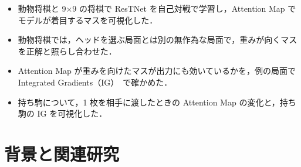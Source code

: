 \documentclass[submit]{ipsj}
\begin{document}
\begin{itemize}
  \item 動物将棋と 9×9 の将棋で ResTNet を自己対戦で学習し，Attention Map でモデルが着目するマスを可視化した．
  \item 動物将棋では，ヘッドを選ぶ局面とは別の無作為な局面で，重みが向くマスを正解と照らし合わせた．
  \item Attention Map が重みを向けたマスが出力にも効いているかを，例の局面で Integrated Gradients（IG）~\cite{ig}で確かめた．
  \item 持ち駒について，1 枚を相手に渡したときの Attention Map の変化と，持ち駒の IG を可視化した．
\end{itemize}

\section{背景と関連研究}
\end{document}
